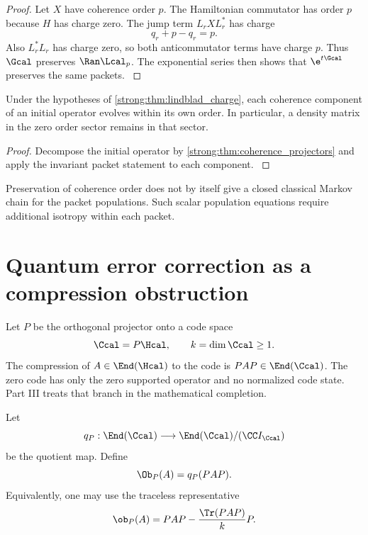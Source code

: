 \begin{proof}\label{strong:proof:037}
Let \(X\) have coherence order \(p\). The Hamiltonian commutator has order \(p\) because \(H\) has charge zero. The jump term \(L_rXL_r^*\) has charge
\[
q_r+p-q_r=p.
\]
Also \(L_r^*L_r\) has charge zero, so both anticommutator terms have charge \(p\). Thus \(\Gcal\) preserves \(\Ran\Lcal_p\). The exponential series then shows that \(\e^{t\Gcal}\) preserves the same packets.
\label{strong:proof:037:end}\end{proof}

\begin{corollary}\label{strong:corollary:010}\label{strong:cor:no_coherence_mixing}
Under the hypotheses of \cref{strong:thm:lindblad_charge}, each coherence component of an initial operator evolves within its own order. In particular, a density matrix in the zero order sector remains in that sector.
\end{corollary}

\begin{proof}\label{strong:proof:038}
Decompose the initial operator by \cref{strong:thm:coherence_projectors} and apply the invariant packet statement to each component.
\label{strong:proof:038:end}\end{proof}

Preservation of coherence order does not by itself give a closed classical Markov chain for the packet populations. Such scalar population equations require additional isotropy within each packet.

\section{Quantum error correction as a compression obstruction}\label{strong:section:008}\label{strong:sec:qec}

Let \(P\) be the orthogonal projector onto a code space
\[
\Ccal=P\Hcal,
\qquad
k=\dim\Ccal\ge1.
\]
The compression of \(A\in\End(\Hcal)\) to the code is \(PAP\in\End(\Ccal)\). The zero code has only the zero supported operator and no normalized code state. Part III treats that branch in the mathematical completion.

\begin{definition}\label{strong:definition:005}\label{strong:def:code_obstruction}
Let
\[
q_P:\End(\Ccal)\longrightarrow\End(\Ccal)/(\CC I_{\Ccal})
\]
be the quotient map. Define
\[
\Ob_P(A)=q_P(PAP).
\]
Equivalently, one may use the traceless representative
\[
\ob_P(A)
=
PAP-
\frac{\Tr(PAP)}{k}P.
\]
\end{definition}

